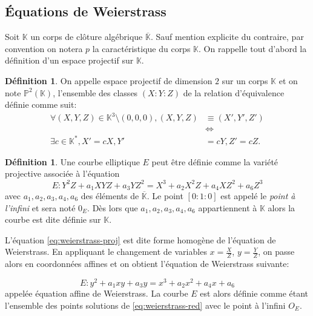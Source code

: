 \documentclass[10pt,a4paper]{book}
\theoremstyle{plain}
\theoremstyle{definition}
\theoremstyle{definition}
\theoremstyle{definition}
\theoremstyle{definition}
\theoremstyle{definition}
\newtheorem{defi}[thm]{Définition}
\theoremstyle{remark}
\theoremstyle{remark}
\theoremstyle{definition}
\begin{document}
\subsection{\'Equations de Weierstrass}

Soit $\mathbb{K}$ un corps de clôture algébrique $\overline{\mathbb{K}}$. Sauf mention explicite du contraire, par convention on notera $p$ la caractéristique du corps $\mathbb{K}$. On rappelle tout d'abord  la définition d'un espace projectif sur $\mathbb{K}$.

\begin{defi}
On appelle espace projectif de dimension $2$ sur un corps $\mathbb{K}$ et on note $\mathbb{P}^2(\mathbb{K})$, l'ensemble des classes $(X:Y:Z)$ de la relation d'équivalence définie comme suit:
\begin{equation*}
\begin{alignedat}{1}
\forall (X,Y,Z) \in \mathbb{K}^3 \setminus (0,0,0), (X,Y,Z) &\equiv (X',Y',Z')\\ 
&\Leftrightarrow  \\
\exists c \in \mathbb{K}^*, X'=cX, Y' &=cY, Z'=cZ.
\end{alignedat}
\end{equation*}
\end{defi}

\begin{defi}
Une courbe elliptique $E$ peut être définie comme la variété projective associée à l'équation
\begin{equation}
\label{eq:weierstrass-proj}
E:Y^2Z+a_1XYZ+a_3YZ^2=X^3+a_2X^2Z+a_4XZ^2+a_6Z^3
\end{equation}
avec $a_1,a_2,a_3,a_4,a_6$ des éléments de $\overline{\mathbb{K}}$. Le point $[0:1:0]$ est appelé le \emph{point à l'infini} et sera noté $0_E$. Dès lors que $a_1,a_2,a_3,a_4,a_6$ appartiennent à $\mathbb{K}$ alors la courbe est dite définie sur $\mathbb{K}$.
\end{defi}

L'équation \eqref{eq:weierstrass-proj} est dite forme homogène de l'équation de Weierstrass. En appliquant le changement de variables $x=\frac{X}{Z}$, $y=\frac{Y}{Z}$, on passe alors en coordonnées affines et on obtient l'équation de Weierstrass suivante:

\begin{equation}
\label{eq:weierstrass-red}
E:y^2+a_1xy+a_3y=x^3+a_2x^2+a_4x+a_6
\end{equation}
appelée équation affine de Weierstrass. La courbe $E$ est alors définie comme étant l'ensemble des points solutions de \eqref{eq:weierstrass-red} avec le point à l'infini $O_E$.
\end{document}
